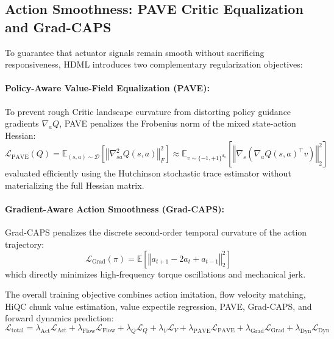 \documentclass{article}
\begin{document}
\subsection{Action Smoothness: PAVE Critic Equalization and Grad-CAPS}
To guarantee that actuator signals remain smooth without sacrificing responsiveness, HDML introduces two complementary regularization objectives:

\paragraph{Policy-Aware Value-Field Equalization (PAVE):} 
To prevent rough Critic landscape curvature from distorting policy guidance gradients $\nabla_a Q$, PAVE penalizes the Frobenius norm of the mixed state-action Hessian:
\begin{equation}
    \mathcal{L}_{\text{PAVE}}(Q) = \mathbb{E}_{(s, a) \sim \mathcal{D}} \left[ \left\Vert \nabla_{sa}^2 Q(s, a) \right\Vert_F^2 \right] \approx \mathbb{E}_{v \sim \{-1, +1\}^{d_a}} \left[ \left\Vert \nabla_s \left( \nabla_a Q(s, a)^\top v \right) \right\Vert_2^2 \right]
\end{equation}
evaluated efficiently using the Hutchinson stochastic trace estimator without materializing the full Hessian matrix.

\paragraph{Gradient-Aware Action Smoothness (Grad-CAPS):} 
Grad-CAPS penalizes the discrete second-order temporal curvature of the action trajectory:
\begin{equation}
    \mathcal{L}_{\text{Grad}}(\pi) = \mathbb{E} \left[ \left\Vert a_{t+1} - 2 a_t + a_{t-1} \right\Vert_2^2 \right]
\end{equation}
which directly minimizes high-frequency torque oscillations and mechanical jerk.

The overall training objective combines action imitation, flow velocity matching, HiQC chunk value estimation, value expectile regression, PAVE, Grad-CAPS, and forward dynamics prediction:
\begin{equation}
    \mathcal{L}_{\text{total}} = \lambda_{\text{Act}} \mathcal{L}_{\text{Act}} + \lambda_{\text{Flow}} \mathcal{L}_{\text{Flow}} + \lambda_Q \mathcal{L}_Q + \lambda_V \mathcal{L}_V + \lambda_{\text{PAVE}} \mathcal{L}_{\text{PAVE}} + \lambda_{\text{Grad}} \mathcal{L}_{\text{Grad}} + \lambda_{\text{Dyn}} \mathcal{L}_{\text{Dyn}}
\end{equation}
\end{document}
